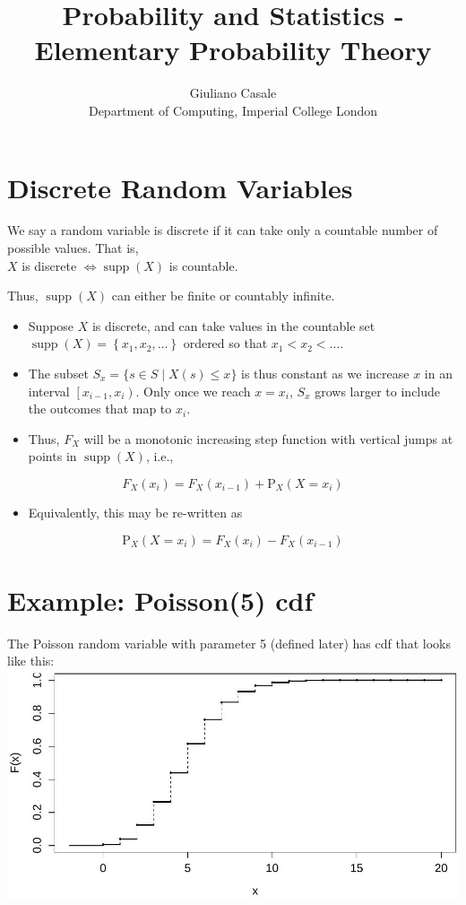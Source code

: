 \documentclass[10pt]{article}
\title{Probability and Statistics - Elementary Probability Theory }
\author{Giuliano Casale\\
Department of Computing, Imperial College London}
\date{}
\begin{document}
\maketitle


\section*{Discrete Random Variables}
We say a random variable is discrete if it can take only a countable number of possible values. That is,\\
$X$ is discrete $\Longleftrightarrow \operatorname{supp}(X)$ is countable.

Thus, $\operatorname{supp}(X)$ can either be finite or countably infinite.

\begin{itemize}
  \item Suppose $X$ is discrete, and can take values in the countable set $\operatorname{supp}(X)=\left\{x_{1}, x_{2}, \ldots\right\}$ ordered so that $x_{1}<x_{2}<\ldots$.
  \item The subset $S_{x}=\{s \in S \mid X(s) \leq x\}$ is thus constant as we increase $x$ in an interval $\left[x_{i-1}, x_{i}\right)$. Only once we reach $x=x_{i}$, $S_{x}$ grows larger to include the outcomes that map to $x_{i}$.
  \item Thus, $F_{X}$ will be a monotonic increasing step function with vertical jumps at points in $\operatorname{supp}(X)$, i.e.,
\end{itemize}

$$
F_{X}\left(x_{i}\right)=F_{X}\left(x_{i-1}\right)+\mathrm{P}_{X}\left(X=x_{i}\right)
$$

\begin{itemize}
  \item Equivalently, this may be re-written as
\end{itemize}

$$
\mathrm{P}_{X}\left(X=x_{i}\right)=F_{X}\left(x_{i}\right)-F_{X}\left(x_{i-1}\right)
$$

\section*{Example: Poisson(5) cdf}
The Poisson random variable with parameter 5 (defined later) has cdf that looks like this:\\
\includegraphics[max width=\textwidth, center]{2025_05_11_35704811148ad612caa6g-04}
\end{document}
